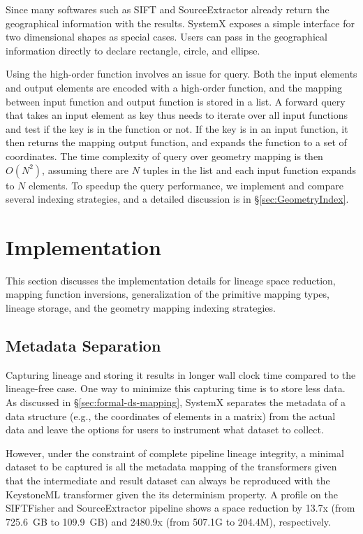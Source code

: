 \documentclass{sig-alternate}
\begin{document}
Since many softwares such as SIFT and SourceExtractor already return the geographical information with the results.
SystemX exposes a simple interface for two dimensional shapes as special cases.
Users can pass in the geographical information directly to declare rectangle, circle, and ellipse.

Using the high-order function involves an issue for query. 
Both the input elements and output elements are encoded with a high-order function, 
and the mapping between input function and output function is stored in a list. 
A forward query that takes an input element as key thus needs to iterate over all input functions and test if the key is in the function or not.
If the key is in an input function, it then returns the mapping output function, and expands the function to a set of coordinates.
The time complexity of query over geometry mapping is then $O(N^2)$, assuming there are $N$ tuples in the list and each input function expands to $N$ elements.
To speedup the query performance, we implement and compare several indexing strategies, and a detailed discussion is in \S\ref{sec:GeometryIndex}.


\section{Implementation}
\label{sec:Impl}
This section discusses the implementation details for lineage space reduction, mapping function inversions, 
generalization of the primitive mapping types, lineage storage, and the geometry mapping indexing strategies.


\subsection{Metadata Separation}
Capturing lineage and storing it results in longer wall clock time compared to the lineage-free case. 
One way to minimize this capturing time is to store less data.
As discussed in \S\ref{sec:formal-ds-mapping}, SystemX separates the metadata of a data structure 
(e.g., the coordinates of elements in a matrix) from the actual data  and leave the options for users to 
instrument what dataset to collect.

However, under the constraint of complete pipeline lineage integrity, a minimal dataset to be captured
is all the metadata mapping of the transformers given that the intermediate and result 
dataset can always be reproduced with the KeystoneML transformer given the its determinism property. 
A profile on the SIFTFisher and SourceExtractor pipeline shows a space reduction by 
13.7x (from 725.6~GB to 109.9~GB) and 2480.9x (from 507.1G to 204.4M), respectively.
\end{document}
